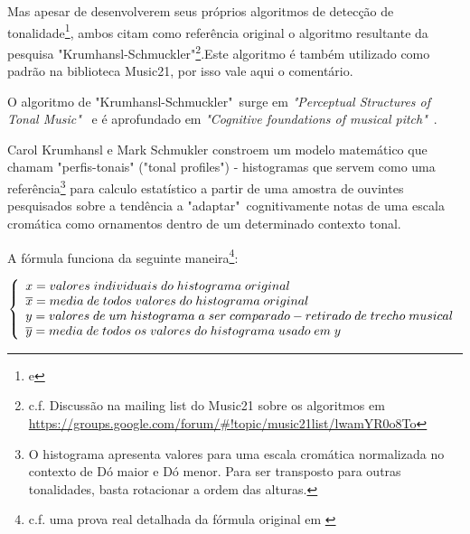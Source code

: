 \documentclass[
	12pt,				%
	openright,			%
	twoside,			%
	a4paper,			%
	english,			%
	french,				%
	spanish,			%
	brazil				%
	]{abntex2}
\begin{document}
Mas apesar de desenvolverem seus próprios algoritmos de detecção de tonalidade\footnote{\cite[ p.173]{temperley2001cognition} e }, ambos citam como referência original o algoritmo resultante da pesquisa "Krumhansl-Schmuckler"\footnote{c.f. Discussão na mailing list do Music21 sobre os algoritmos em \url{https://groups.google.com/forum/\#!topic/music21list/lwamYR0o8To}}.Este algoritmo é também utilizado como padrão na biblioteca Music21, por isso vale aqui o comentário.

O algoritmo de "Krumhansl-Schmuckler"\ surge em \textit{"Perceptual Structures of Tonal Music"}\ \cite{krumhansl1983perceptual} e é aprofundado em \textit{"Cognitive foundations of musical pitch"}\ \cite{krumhansl1990cognitive}.

Carol Krumhansl e Mark Schmukler constroem um modelo matemático que chamam "perfis-tonais" ("tonal profiles") - histogramas que servem como uma referência\footnote{O histograma apresenta valores para uma escala cromática normalizada no contexto de Dó maior e Dó menor. Para ser transposto para outras tonalidades, basta rotacionar a ordem das alturas.} para calculo estatístico a partir de uma amostra de ouvintes pesquisados sobre a tendência a "adaptar"\ cognitivamente \cite[ p. 173]{temperley2001cognition} notas de uma escala cromática como ornamentos dentro de um determinado contexto tonal.

A fórmula funciona da seguinte maneira\footnote{c.f. uma prova real detalhada da fórmula original em \cite[p.37]{krumhansl1990cognitive} }:



$ \left\{
  \begin{array}{l l}
x = valores\;individuais\;do\;histograma\;original \\
\overline{x} = media\;de\;todos\;valores\;do\;histograma\;original \\
y = valores\;de\;um\;histograma\;a\;ser\;comparado - retirado\;de\;trecho\;musical \\
\overline{y} = media\;de\;todos\;os\;valores\;do\;histograma\;usado\;em\;y \\
    
  \end{array} \right.
$
\end{document}
